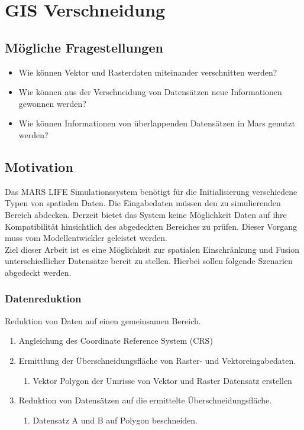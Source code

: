 
\chapter{GIS Verschneidung}



\section{Mögliche Fragestellungen}
\begin{itemize}
	\item Wie können Vektor und Rasterdaten miteinander verschnitten werden?
	\item Wie können aus der Verschneidung von Datensätzen neue Informationen gewonnen werden?
	\item Wie können Informationen von überlappenden Datensätzen in Mars genutzt werden?
\end{itemize}



\section{Motivation}
Das MARS LIFE Simulationssystem benötigt für die Initialisierung verschiedene Typen von spatialen Daten. Die Eingabedaten müssen den zu simulierenden Bereich abdecken. Derzeit bietet das System keine Möglichkeit Daten auf ihre Kompatibilität hinsichtlich des abgedeckten Bereiches zu prüfen. Dieser Vorgang muss vom Modellentwickler geleistet werden.\\
Ziel dieser Arbeit ist es eine Möglichkeit zur spatialen Einschränkung und Fusion unterschiedlicher Datensätze bereit zu stellen. Hierbei sollen folgende Szenarien abgedeckt werden.


\subsection{Datenreduktion}
Reduktion von Daten auf einen gemeinsamen Bereich.
\begin{enumerate}
	\item Angleichung des Coordinate Reference System (CRS)
	\item Ermittlung der Überschneidungsfläche von Raster- und Vektoreingabedaten.
	\begin{enumerate}
		\item Vektor Polygon der Umrisse von Vektor und Raster Datensatz erstellen
	\end{enumerate}
	\item Reduktion von Datensätzen auf die ermittelte Überschneidungsfläche.
	\begin{enumerate}
		\item Datensatz A und B auf Polygon beschneiden.
	\end{enumerate}
\end{enumerate}

